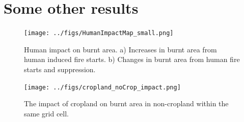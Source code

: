 \section{Some other results}
\begin{figure}[!ht]
\begin{shaded}
  \centering
    \texttt{[image: ../figs/HumanImpactMap\_small.png]}

  \caption{Human impact on burnt area.
            a) Increases in burnt area from human induced fire starts.
            b) Changes in burnt area from human fire starts and suppression.}
    \label{fig:human_impact}
\end{shaded}
\end{figure}

\begin{figure}
\begin{shaded}
  \centering
    \texttt{[image: ../figs/cropland\_noCrop\_impact.png]}

  \caption{The impact of cropland on burnt area in non-cropland within the same grid cell.}
\end{shaded}
\end{figure}
